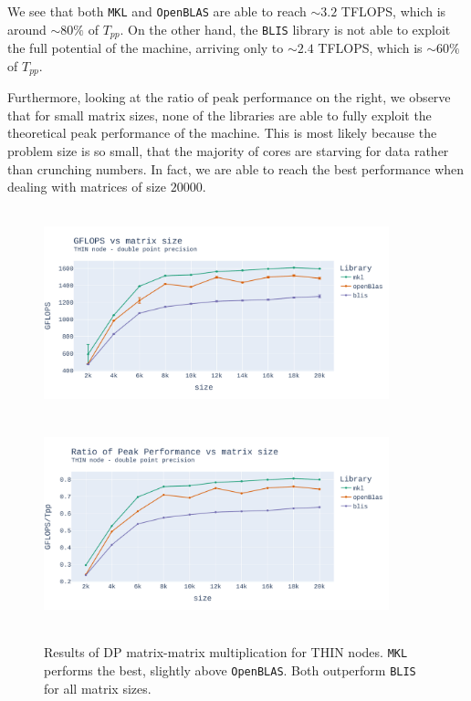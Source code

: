 \documentclass{report}
\begin{document}
We see that both \texttt{MKL} and \texttt{OpenBLAS} are able to reach $\sim 3.2$ 
TFLOPS, which is around $\sim80\%$ of $T_{pp}$. On the other hand, the \texttt{BLIS}
library is not able to exploit the full potential of the machine, arriving only
to $\sim 2.4$ TFLOPS, which is $\sim60\%$ of $T_{pp}$.

Furthermore, looking at the ratio of peak performance on the right, we observe 
that for small matrix sizes, none of the libraries are able to fully exploit 
the theoretical peak performance of the machine. This is most likely because the 
problem size is so small, that the majority of cores are starving for data rather 
than crunching numbers. In fact, we are able to reach the best performance when 
dealing with matrices of size $20000$. 

\begin{figure}[H]
\hspace*{-2.5cm}
\includegraphics[width=10cm, height=6cm]{./images/fixed_cores_thin_double_gflops.pdf}
\includegraphics[width=10cm, height=6cm]{./images/fixed_cores_thin_double_gflops_ratio.pdf}
\caption{\label{fig:fixed_cores_thin_double} Results of DP matrix-matrix multiplication 
for THIN nodes. \texttt{MKL} performs the best, slightly above \texttt{OpenBLAS}. 
Both outperform \texttt{BLIS} for all matrix sizes.}
\end{figure}
\end{document}
